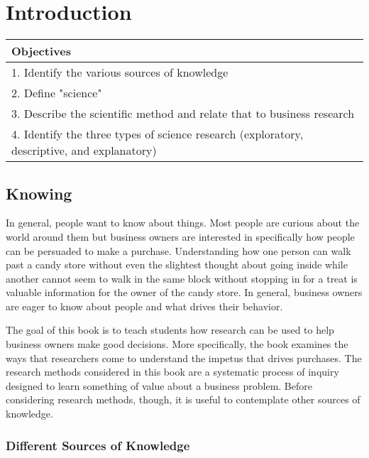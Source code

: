 \chapter{Introduction}\label{ch01:introduction}

\begin{center}
	\begin{tabularx}{.90\linewidth}{X}
		\hline 
		\textbf{ Objectives } \\ 
		\hline
		1. Identify the various sources of knowledge\\ 
		2. Define "science"\\ 
		3. Describe the scientific method and relate that to business research\\ 
		4. Identify the three types of science research (exploratory, descriptive, and explanatory)\\ 
		\hline
	\end{tabularx}
\end{center}
\medskip

\section{Knowing}

In general, people want to know about things. Most people are curious about the world around them but business owners are interested in specifically how people can be persuaded to make a purchase. Understanding how one person can walk past a candy store without even the slightest thought about going inside while another cannot seem to walk in the same block without stopping in for a treat is valuable information for the owner of the candy store. In general, business owners are eager to know about people and what drives their behavior.

The goal of this book is to teach students how research can be used to help business owners make good decisions. More specifically, the book examines the ways that researchers come to understand the impetus that drives purchases. The research methods considered in this book are a systematic process of inquiry designed to learn something of value about a business problem. Before considering research methods, though, it is useful to contemplate other sources of knowledge.

\subsection{Different Sources of Knowledge}\label{ch01.01}

